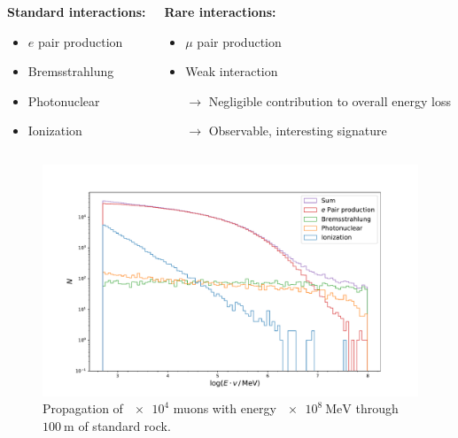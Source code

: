 \documentclass[aspectratio=1610, captions=tableheading, 11pt]{beamer}
\begin{document}
\begin{frame}
\begin{columns}
  \begin{center}
    \begin{minipage}{0.9\textwidth}
      \textbf{Standard interactions:}
      \begin{itemize}
        \item $e$ pair production
        \item Bremsstrahlung
        \item Photonuclear
        \item Ionization
      \end{itemize}
    \end{minipage}
  \end{center}

  \begin{center}
    \begin{minipage}{0.9\textwidth}
      \textbf{Rare interactions:}
      \begin{itemize}
         \item $\mu$ pair production
          \item Weak interaction
          \item[$\rightarrow$] Negligible contribution to overall energy loss
          \item[$\rightarrow$] Observable, interesting signature
      \end{itemize}
    \end{minipage}
  \end{center}

\end{columns}
\end{frame}





\begin{frame}

\begin{figure}
    \centering
    \includegraphics[height=0.85\textheight, trim=1.9cm 0.5cm 1.9cm 2cm,clip=true]{plots/standard.pdf}
    \caption*{Propagation of $\num{e4}$ muons with energy $\SI{e8}{\mega\electronvolt}$ through $\SI{100}{\metre}$ of standard rock.}
    \label{fig:1}
\end{figure}
\end{frame}
\end{document}
